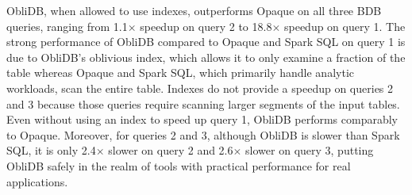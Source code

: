 \documentclass[letterpaper,twocolumn,10pt]{article}
\def\name/{ObliDB}
\begin{document}
\name/, when allowed to use indexes, outperforms Opaque on all three BDB queries, ranging from 1.1$\times$ speedup on query 2 to 18.8$\times$ speedup on query 1. The strong performance of \name/ compared to Opaque and Spark SQL on query 1 is due to \name/'s oblivious index, which allows it to only examine a fraction of the table whereas Opaque and Spark SQL, which primarily handle analytic workloads, scan the entire table. Indexes do not provide a speedup on queries 2 and 3 because those queries require scanning larger segments of the input tables. Even without using an index to speed up query 1, \name/ performs comparably to Opaque. Moreover, for queries 2 and 3, although \name/ is slower than Spark SQL, it is only 2.4$\times$ slower on query 2 and 2.6$\times$ slower on query 3, putting \name/ safely in the realm of tools with practical performance for real applications.
\end{document}
